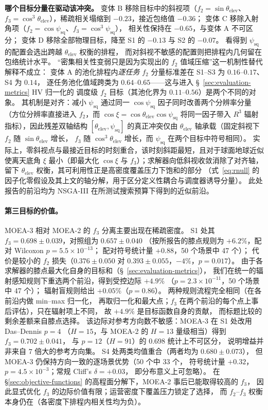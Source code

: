 \documentclass[preprint,12pt,authoryear]{elsarticle}
\begin{document}
\textbf{哪个目标分量在驱动该冲突。}
变体 B 移除目标中的斜视项（$f_2=\sin\theta_{\text{elev}}$、
$f_3=\cos^3\theta_{\text{elev}}$），稀疏相关塌缩到 $-0.23$，接近包络值 $-0.36$；
变体 C 移除入射角项（$f_2=\cos\psi_{\text{sq}}$、$f_3=\cos^3\psi_{\text{sq}}$），
相关性保持在 $-0.65$，与变体 A 不可区分；
变体 D 移除全部物理目标，降至 S1 的 $-0.13$ 与 S2 的 $-0.07$。
看得到 $\psi_{\text{sq}}$ 的配置会选出跨越 $\theta_{\text{elev}}$ 权衡的排程，
而对斜视不敏感的配置则把排程内几何留在包络统计水平。
“密集相关性变弱只是因为实现出的 $f_2$ 值域压缩”这一机制性替代解释不成立：
变体 A 的池化排程内\emph{逐任务} $f_2$ 分量标准差在 S1--S3 为 $0.16$--$0.17$、S4 为 $0.14$，
逐任务池化值域跨类为 $0.64$--$0.65$——这与进入 \S~\ref{sec:evaluation-metrics} HV 归一化的
调度级 $f_2$ 目标（其池化界为 $0.11$--$0.56$）是两个不同的对象。
其机制是对齐：减小 $\psi_{\text{sq}}$ 通过同一 $\cos\psi_{\text{sq}}$ 因子同时改善两个分辨率分量
（方位分辨率直接进入 $f_2$，而 $\cos\xi = \cos\theta_{\text{elev}}\cos\psi_{\text{sq}}$
将同一因子带入 $R^3$ 辐射指标），因此残差双轴结构 $[\theta_{\text{elev}}, \psi_{\text{sq}}]$
的真正冲突仅由 $\theta_{\text{elev}}$ 轴承载（固定斜视下 $f_2$ 随 $\sin\theta_{\text{elev}}$ 增长，
$f_3$ 随 $\cos^3\theta_{\text{elev}}$ 增长，而 $\psi_{\text{sq}}$ 在两个目标中符号相同）。
实际上，零斜视点与最接近目标的时刻重合，该时刻斜距最短，且对于球面地球近似使离天底角
$\xi$ 最小（即最大化 $\cos\xi$ 与 $f_3$）；求解器向低斜视收敛消除了对齐轴，留下
$\theta_{\text{elev}}$ 权衡，其可利用性正是高密度覆盖压力下饱和的部分
（式~\ref{eq:rnull} 的因子化零假设及其上文的轴分解，用于区分定义性耦合与调度器诱导分量）。
此处报告的前沿均为 NSGA-III 在所测试搜索预算下得到的近似前沿。

\paragraph{第三目标的价值。}\label{par:third-objective}
MOEA-3 相对 MOEA-2 的 $f_3$ 分离主要出现在稀疏密度。
S1 处其 $f_3 = 0.698\pm0.039$，对照组为 $0.657\pm0.040$
（按所报告的膝点规则为 $+6.2\%$，配对 Wilcoxon $p = 5.5\times10^{-13}$；
配对符号统计量 $+0.88$，50 个场景中 47 个）；
代价是较小的 $f_2$ 损失（$0.376\pm0.050$ 对 $0.393\pm0.055$，$-4\%$，$p = 0.017$）。
由于各求解器的膝点最大化自身的目标和（\S~\ref{sec:evaluation-metrics}），
我们在统一的辐射感知规则下重选两个前沿，得到受控边际 $+4.9\%$
（$p = 2.3\times10^{-11}$，50 个场景中 47 个）；
辐射盲规则给出 $+0.05\%$（$p = 0.86$）。
两种规则流程完全相同（在各前沿内做 min--max 归一化，
再取归一化和最大点；$f_3$ 在两个前沿的每个点上事后评估），只在辐射项上不同，
故 $+4.9\%$ 是目标函数自身的贡献，
而标题比较的剩余差额来自膝点选择。
该边际对参考方向数不敏感：MOEA-3 在 S1 处改用 Das--Dennis $p=4$
（$H=15$，与 MOEA-2 的 $H=13$ 量级相当）得到 $f_3 = 0.702\pm0.041$，
与 $p=12$（$H=91$）的 $0.698$ 统计上不可区分，
说明增益并非来自 $7$ 倍大的参考方向集。
S4 处两类均值重合（两者均为 $0.680\pm0.073$），
但 MOEA-3 仍保持方向一致的逐场景优势（50 个中 33 个，
符号统计量 $+0.32$，$p = 4.5\times10^{-3}$；常规 Cliff's $\delta = +0.03$，
即分布意义上可忽略）。
在 \S\ref{sec:objective-functions} 的高程面分解下，MOEA-2 事后已能取得较高的 $f_3$，
因此显式优化 $f_3$ 的边际价值有限；运营密度下覆盖压力锁定了选择，
而 $f_2$--$f_3$ 权衡本身仍在（各密度下排程内相关性均为负）。
\end{document}
